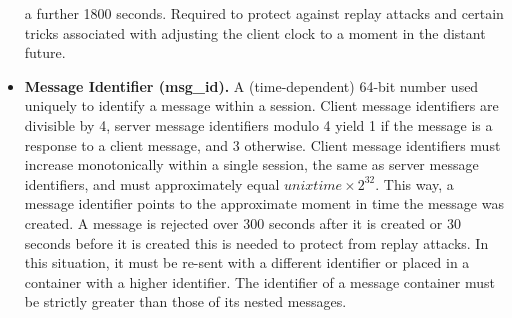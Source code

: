 \begin{itemize}
    a further 1800 seconds.
    Required to protect against replay attacks and certain tricks associated with adjusting the client clock to
    a moment in the distant future.
    \item \textbf{Message Identifier (msg\_id).} A (time-dependent) 64-bit number used uniquely to identify a
    message within a session.
    Client message identifiers are divisible by 4, server message identifiers modulo 4 yield 1 if the message is a
    response to a client message, and 3 otherwise.
    Client message identifiers must increase monotonically within a single session, the same as server message
    identifiers, and must approximately equal $unixtime \times 2^{32}$.
    This way, a message identifier points to the approximate moment in time the message was created.
    A message is rejected over 300 seconds after it is created or 30 seconds before it is created
    this is needed to protect from replay attacks.
    In this situation, it must be re-sent with a different identifier or placed in a container with a higher identifier.
    The identifier of a message container must be strictly greater than those of its nested messages.
\end{itemize}